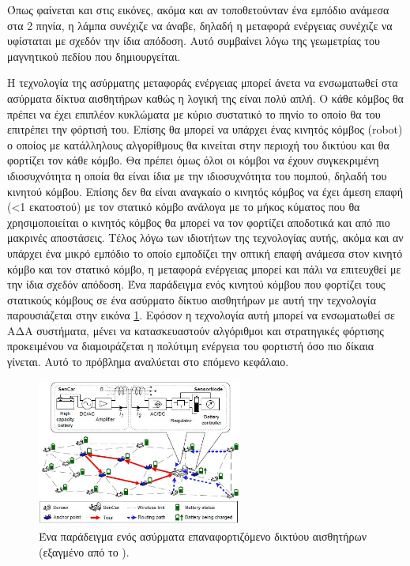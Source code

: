 Όπως φαίνεται και στις εικόνες, ακόμα και αν τοποθετούνταν ένα εμπόδιο ανάμεσα στα 2 πηνία, η λάμπα συνέχιζε να άναβε, δηλαδή η μεταφορά ενέργειας συνέχιζε να
υφίσταται με σχεδόν την ίδια απόδοση. Αυτό συμβαίνει λόγω της γεωμετρίας του μαγνητικού πεδίου που δημιουργείται.

Η τεχνολογία της ασύρματης μεταφοράς ενέργειας μπορεί άνετα να ενσωματωθεί στα ασύρματα δίκτυα αισθητήρων καθώς η λογική της είναι πολύ απλή. Ο κάθε κόμβος θα πρέπει
να έχει επιπλέον κυκλώματα με κύριο συστατικό το πηνίο το οποίο θα του επιτρέπει την φόρτισή του. Επίσης θα μπορεί να υπάρχει ένας κινητός κόμβος (robot) ο οποίος με
κατάλληλους αλγορίθμους θα κινείται στην περιοχή του δικτύου και θα φορτίζει τον κάθε κόμβο. Θα πρέπει όμως όλοι οι κόμβοι να έχουν συγκεκριμένη ιδιοσυχνότητα η
οποία θα είναι ίδια με την ιδιοσυχνότητα του πομπού, δηλαδή του κινητού κόμβου. Επίσης δεν θα είναι αναγκαίο ο κινητός κόμβος να έχει άμεση επαφή (<1 εκατοστού) με
τον στατικό κόμβο ανάλογα με το μήκος κύματος που θα χρησιμοποιείται ο κινητός κόμβος θα μπορεί να τον φορτίζει αποδοτικά και από πιο μακρινές αποστάσεις. Τέλος λόγω
των ιδιοτήτων της τεχνολογίας αυτής, ακόμα και αν υπάρχει ένα μικρό εμπόδιο το οποίο εμποδίζει την οπτική επαφή ανάμεσα στον κινητό κόμβο και τον στατικό κόμβο, η
μεταφορά ενέργειας μπορεί και πάλι να επιτευχθεί με την ίδια σχεδόν απόδοση. Ένα παράδειγμα ενός κινητού κόμβου που φορτίζει τους στατικούς κόμβους σε ένα ασύρματο
δίκτυο αισθητήρων με αυτή την τεχνολογία παρουσιάζεται στην εικόνα \ref{fig:wrsn_example}. Εφόσον η τεχνολογία αυτή μπορεί να ενσωματωθεί σε ΑΔΑ συστήματα, μένει να
κατασκευαστούν αλγόριθμοι και στρατηγικές φόρτισης προκειμένου να διαμοιράζεται η πολύτιμη ενέργεια του φορτιστή όσο πιο δίκαια γίνεται. Αυτό το πρόβλημα αναλύεται
στο επόμενο κεφάλαιο.


\begin{figure}[h]
	\centering
	\includegraphics[width=0.6\textwidth]{images/sencar_example.jpg}
	\caption{Ένα παράδειγμα ενός ασύρματα επαναφορτιζόμενο δικτύου αισθητήρων (εξαγμένο από το \cite{yuanyuan_joint}).}
	\label{fig:wrsn_example}
\end{figure}
